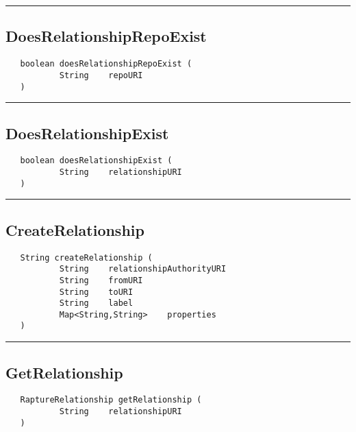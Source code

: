 \rule{15cm}{2pt}
\subsection{DoesRelationshipRepoExist}
\label{Api:DoesRelationshipRepoExist}
\begin{verbatim}
   boolean doesRelationshipRepoExist (
           String    repoURI
   )
\end{verbatim}



\rule{15cm}{2pt}
\subsection{DoesRelationshipExist}
\label{Api:DoesRelationshipExist}
\begin{verbatim}
   boolean doesRelationshipExist (
           String    relationshipURI
   )
\end{verbatim}



\rule{15cm}{2pt}
\subsection{CreateRelationship}
\label{Api:CreateRelationship}
\begin{verbatim}
   String createRelationship (
           String    relationshipAuthorityURI
           String    fromURI
           String    toURI
           String    label
           Map<String,String>    properties
   )
\end{verbatim}



\rule{15cm}{2pt}
\subsection{GetRelationship}
\label{Api:GetRelationship}
\begin{verbatim}
   RaptureRelationship getRelationship (
           String    relationshipURI
   )
\end{verbatim}



